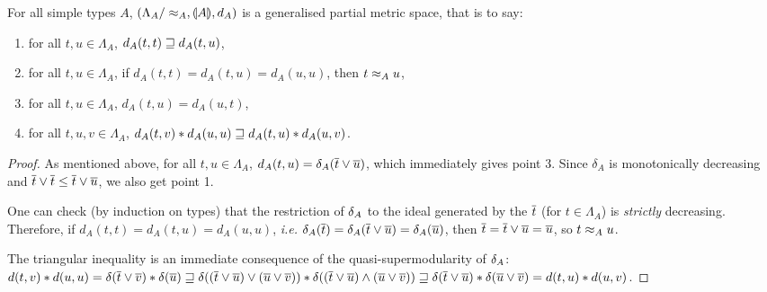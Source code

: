 \begin{corollary} \label{corollary:stlc-metric} For all simple types $A$, $\left(\Lambda_A/\approx_A, \llparenthesis A \rrparenthesis, d_A\right)$ is a generalised partial metric space, that is to say:
\begin{enumerate}
\item for all $t,u \in \Lambda_A$, $d_A(t,t) \sqsupseteq d_A(t,u)$,
\item for all $t,u \in \Lambda_A$, if $d_A(t,t) = d_A(t,u) = d_A(u,u)$, then $t \approx_A u$,
\item for all $t,u \in \Lambda_A$, $d_A(t,u) = d_A(u,t)$,
\item for all $t,u,v \in \Lambda_A$, $d_A(t,v) \mathbin{\ast} d_A(u,u) \sqsupseteq d_A(t,u) \mathbin{\ast} d_A(u,v)$.
\end{enumerate}
\end{corollary}
\begin{proof}
As mentioned above, for all $t,u\in\Lambda_A$, $d_A(t,u) = \delta_A(\overline{t} \vee \overline{u})$, which immediately gives point 3. Since $\delta_A$ is monotonically decreasing and $\overline{t} \vee \overline{t} \leq \overline{t} \vee \overline{u}$, we also get point 1.

One can check (by induction on types) that the restriction of $\delta_A$ to the ideal generated by the $\overline{t}$ (for $t \in \Lambda_A$) is \emph{strictly} decreasing. Therefore, if  $d_A(t,t) = d_A(t,u) = d_A(u,u)$, \textit{i.e.} $\delta_A(\overline{t}) = \delta_A(\overline{t} \vee \overline{u}) = \delta_A(\overline{u})$,  then $\overline{t} = \overline{t} \vee \overline{u} = \overline{u}$, so $t \approx_A u$.

The triangular inequality is an immediate consequence of the quasi-supermodularity of $\delta_A$: $d(t,v) \mathbin{\ast} d(u,u) = \delta(\overline{t} \vee \overline{v}) \mathbin{\ast} \delta(\overline{u}) \sqsupseteq \delta((\overline{t} \vee \overline{u}) \vee (\overline{u} \vee \overline{v})) \mathbin{\ast} \delta((\overline{t} \vee \overline{u}) \wedge (\overline{u} \vee \overline{v})) \sqsupseteq \delta(\overline{t} \vee  \overline{u}) \mathbin{\ast} \delta(\overline{u} \vee  \overline{v}) = d(t,u) \mathbin{\ast} d(u,v)$.
\end{proof}



















